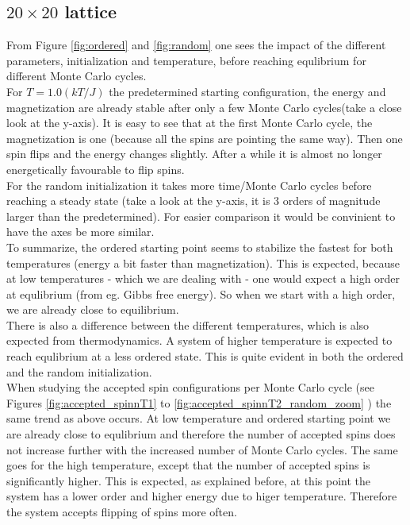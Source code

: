 \documentclass[../main.tex]{subfiles}
\begin{document}
\subsection{$20 \times 20$ lattice}
From Figure \ref{fig:ordered} and \ref{fig:random} one sees the impact of the different parameters, initialization and temperature, before reaching equlibrium for different Monte Carlo cycles. \\
For $T=1.0(kT/J)$ the predetermined starting configuration, the energy and magnetization are already stable after only a few Monte Carlo cycles(take a close look at the y-axis). It is easy to see that at the first Monte Carlo cycle, the magnetization is one (because all the spins are pointing the same way). Then one spin flips and the energy changes slightly. After a while it is almost no longer energetically favourable to flip spins. \\
For the random initialization it takes more time/Monte Carlo cycles before reaching a steady state (take a look at the y-axis, it is 3 orders of magnitude larger than the predetermined). For easier comparison it would be convinient to have the axes be more similar. \\
To summarize, the ordered starting point seems to stabilize the fastest for both temperatures (energy a bit faster than magnetization). This is expected, because at low temperatures - which we are dealing with - one would expect a high order at equlibrium (from eg. Gibbs free energy). So when we start with a high order, we are already close to equilibrium. \\
There is also a difference between the different temperatures, which is also expected from thermodynamics. A system of higher temperature is expected to reach equlibrium at a less ordered state. This is quite evident in both the ordered and the random initialization. \\
When studying the accepted spin configurations per Monte Carlo cycle (see Figures \ref{fig:accepted_spinnT1} to \ref{fig:accepted_spinnT2_random_zoom} ) the same trend as above occurs. At low temperature and ordered starting point we are already close to equlibrium and therefore the number of accepted spins does not increase further with the increased number of Monte Carlo cycles. The same goes for the high temperature, except that the number of accepted spins is significantly higher. This is expected, as explained before, at this point the system has a lower order and higher energy due to higer temperature. Therefore the system accepts flipping of spins more often.
\end{document}
